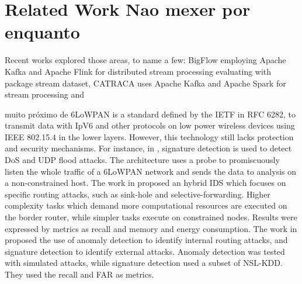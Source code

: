 
\section{Related Work {\color{red} Nao mexer por enquanto}}
\label{sec:related}

Recent works explored those areas, to name a few: BigFlow \cite{Viegas2019}
employing Apache Kafka and Apache Flink for distributed stream processing
evaluating with package stream dataset,
CATRACA \cite{Lopez2018,AndreoniLopez2019a} uses 
Apache Kafka and Apache Spark for stream processing and 

\cite{DaCosta2019a}

{\color{red} muito próximo de \cite{Cassales2019a}}
6LoWPAN is a standard defined by the IETF in RFC 6282, to transmit data with
IpV6 and other protocols on low power wireless devices using IEEE 802.15.4 in
the lower layers. However, this technology still lacks protection and security
mechanisms. %
%
For instance, in \cite{dos-6lowpan-iot}, signature detection is used to detect
DoS and UDP flood attacks. The architecture uses a probe to promiscuously listen
the whole traffic of a 6LoWPAN network and sends the data to analysis on a
non-constrained host.
The work in \cite{SVELTE} proposed an hybrid IDS which focuses on specific
routing attacks, such as sink-hole and selective-forwarding. Higher complexity
tasks which demand more computational resources are executed on the border
router, while simpler tasks execute on constrained nodes. Results were expressed
by metrics as recall and memory and energy consumption.
% 
The work in \cite{Hybrid-ids-arch-iot} proposed the use of anomaly detection to
identify internal routing attacks, and signature detection to identify external
attacks. Anomaly detection was tested with simulated attacks, while signature
detection used a subset of NSL-KDD. They used the recall and FAR as metrics.


